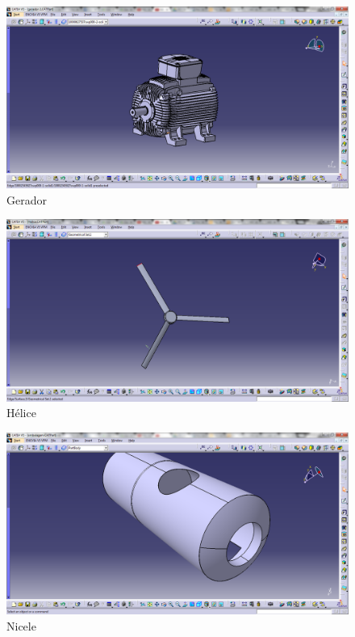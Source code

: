 	\begin{figure}[!htbp]
	  \centering
	  \includegraphics[scale=0.45]{editaveis/figuras/C_Gerador}
	  \caption[Gerador]{Gerador}
	  \label{Gerador}
	\end{figure}
	\FloatBarrier
	
	\begin{figure}[!htbp]
	  \centering
	  \includegraphics[scale=0.45]{editaveis/figuras/C_helice}
	  \caption[Helice]{Hélice}
	  \label{Helice}
	\end{figure}
	\FloatBarrier
	
\begin{figure}[!htbp]
	  \centering
	  \includegraphics[scale=0.45]{editaveis/figuras/C_Nicele}
	  \caption[Nicele]{Nicele}
	  \label{Nicele}
	\end{figure}
	\FloatBarrier
	
